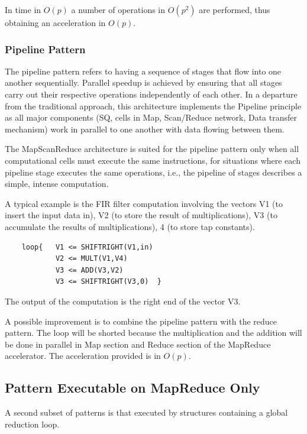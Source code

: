 In time in $O(p)$ a number of operations in $O(p^2)$ are performed, thus obtaining an acceleration in $O(p)$.


\subsubsection{Pipeline  Pattern} 

The pipeline pattern refers to having a sequence of stages that flow into one another sequentially. Parallel speedup is achieved by ensuring that all stages carry out their respective operations independently of each other. In a departure from the traditional approach, this architecture implements the Pipeline principle as all major components (SQ, cells in Map, Scan/Reduce network, Data transfer mechanism) work in parallel to one another with data flowing between them.

The MapScanReduce architecture is suited for the pipeline pattern only when all computational cells must execute the same instructions, for situations where each pipeline stage executes the same operations, i.e., the pipeline of stages describes a simple, intense computation.

A typical example is the FIR filter computation involving the vectors V1 (to insert the input data in), V2 (to store the result of multiplications), V3 (to accumulate the results of multiplications), 4 (to store tap constants).
\begin{verbatim}
    loop{   V1 <= SHIFTRIGHT(V1,in)
            V2 <= MULT(V1,V4)
            V3 <= ADD(V3,V2)
            V3 <= SHIFTRIGHT(V3,0)  }
\end{verbatim}

The output of the computation is the right end of the vector V3.

A possible improvement is to combine the pipeline pattern with the reduce pattern. The loop will be shorted because the multiplication and the addition will be done in parallel in Map section and Reduce section of the MapReduce accelerator. The acceleration provided is in $O(p)$.

\subsection{Pattern Executable on MapReduce Only}

A second subset of patterns is that executed by structures containing a global reduction loop.

